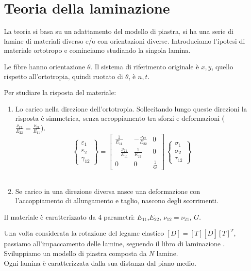 \section{Teoria della laminazione}

La teoria si basa su un adattamento del modello di piastra, si ha una serie di lamine di materiali diverso e/o con orientazioni diverse.
Introduciamo l'ipotesi di materiale ortotropo e cominciamo studiando la singola lamina.

Le fibre hanno orientazione $\theta$. Il sistema di riferimento originale è $x, y$, quello rispetto all'ortotropia, quindi ruotato di   $\theta$, è $n, t$.

Per studiare la risposta del materiale:
\begin{enumerate}
    \item Lo carico nella direzione dell'ortotropia. Sollecitando lungo queste direzioni la risposta è simmetrica, senza accoppiamento tra sforzi e deformazioni ($\frac{\nu_{12}}{E_{22}}=\frac{\nu_{21}}{E_{11}}$).
    \begin{equation*}
\left\{
\begin{array}{c}
\varepsilon_{1} \\
\varepsilon_{2} \\
\gamma_{12}
\end{array}
\right\}
=
\left[
\begin{array}{ccc}
\displaystyle \frac{1}{E_{11}} & \displaystyle-\frac{\nu_{12}}{E_{22}} & 0\\
\displaystyle -\frac{\nu_{21}}{E_{11}} & \displaystyle\frac{1}{E_{22}} &0 \\
0& 0 & \displaystyle\frac{1}{G}
\end{array}
\right]\,
\left\{
\begin{array}{c}
\sigma_{1} \\
\sigma_{2} \\
\tau_{12}
\end{array}
\right\}
\end{equation*}
    \\
    \item Se carico in una direzione diversa nasce una deformazione con l'accoppiamento di allungamento e taglio, nascono degli scorrimenti.
\end{enumerate}

Il materiale è caratterizzato da 4 parametri:  $E_{11}$,$E_{22}$,  $\nu_{12}=\nu_{21}$,  $G$.

Una volta considerata la rotazione del legame elastico $[D] =  \left[T\right][\bar{D}]\left[T\right]^T$, passiamo all'impaccamento delle lamine, seguendo il libro di laminazione .\\ Sviluppiamo un modello di piastra composta da $N$ lamine. \\ Ogni lamina è caratterizzata dalla sua distanza dal piano medio.

